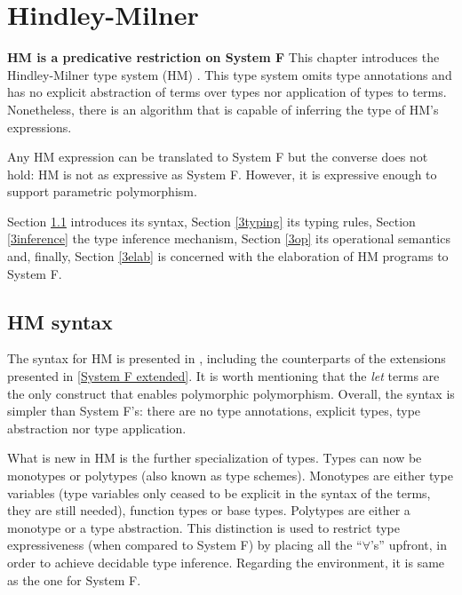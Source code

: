 \chapter{Hindley-Milner}
\label{cha:3}
\textbf{HM is a predicative restriction on System F}
This chapter introduces the Hindley-Milner type system (HM) \cite{damas}. This type system omits type annotations and has no explicit abstraction of terms over types nor application of types to terms. Nonetheless, there is an algorithm that is capable of inferring the type of HM's expressions.

Any HM expression can be translated to System F but the converse does not hold: HM is not as expressive as System F. However, it is expressive enough to support parametric polymorphism.

Section \ref{3syntax} introduces its syntax, Section \ref{3typing} its typing rules, Section \ref{3inference} the type inference mechanism, Section \ref{3op} its operational semantics and, finally, Section \ref{3elab} is concerned with the elaboration of HM programs to System F.
\section{HM syntax}
\label{3syntax}
The syntax for HM is presented in , including the counterparts of the extensions presented in \ref{System F extended}. It is worth mentioning that the \textit{let} terms are the only construct that enables polymorphic polymorphism. Overall, the syntax is simpler than System F's: there are no type annotations, explicit types, type abstraction nor type application.

What is new in HM is the further specialization of types. Types can now be monotypes or polytypes (also known as type schemes). Monotypes are either type variables (type variables only ceased to be explicit in the syntax of the terms, they are still needed), function types or base types. Polytypes are either a monotype or a type abstraction. This distinction is used to restrict type expressiveness (when compared to System F) by placing all the ``$\forall$'s'' upfront, in order to achieve decidable type inference. Regarding the environment, it is same as the one for System F.





